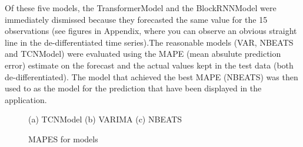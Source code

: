 \documentclass{article}
\begin{document}
Of these five models, the TransformerModel and the BlockRNNModel were immediately dismissed because they forecasted the same value for the 15 observations (see figures in Appendix, where you can observe an obvious straight line in the de-differentiated time series).The reasonable models (VAR, NBEATS and TCNModel) were evaluated using the MAPE (mean absulute prediction error) estimate on the forecast and the actual values kept in the test data (both de-differentiated). The model that achieved the best MAPE (NBEATS) was then used to as the model for the prediction that have been displayed in the application.
\begin{figure}[h]
    \centering
    \caption{(a) TCNModel (b) VARIMA (c) NBEATS}
    \label{fig:foobar}
\end{figure}

\begin{figure}[h]
\centering
    \begin{bchart}[max=100, unit = \%]
    \end{bchart}
\caption{MAPES for models}
\end{figure}
\end{document}
